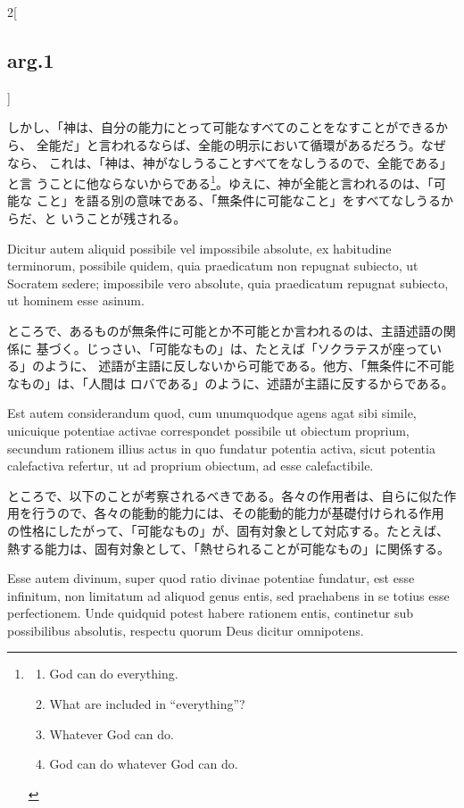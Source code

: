 \documentclass[paper=a4paper,fontsize=10pt,jafontsize=9pt,titlepage]{jlreq}
\begin{document}
\begin{paracol}{2}[\subsection{arg.1}]
\switchcolumn

しかし、「神は、自分の能力にとって可能なすべてのことをなすことができるから、
 全能だ」と言われるならば、全能の明示において循環があるだろう。なぜなら、
 これは、「神は、神がなしうることすべてをなしうるので、全能である」と言
 うことに他ならないからである\footnote
{\begin{enumerate}
  \item God can do everything.
  \item What are included in ``everything''?
  \item Whatever God can do.
  \item God can do whatever God can do.
 \end{enumerate}
}。ゆえに、神が全能と言われるのは、「可能な
 こと」を語る別の意味である、「無条件に可能なこと」をすべてなしうるからだ、と
 いうことが残される。

\switchcolumn*

Dicitur autem aliquid possibile
vel impossibile absolute, ex habitudine terminorum, possibile quidem,
quia praedicatum non repugnat subiecto, ut Socratem sedere; impossibile
vero absolute, quia praedicatum repugnat subiecto, ut hominem esse
asinum.

\switchcolumn

ところで、あるものが無条件に可能とか不可能とか言われるのは、主語述語の関係に
 基づく。じっさい、「可能なもの」は、たとえば「ソクラテスが座っている」のように、
 述語が主語に反しないから可能である。他方、「無条件に不可能なもの」は、「人間は
 ロバである」のように、述語が主語に反するからである。

\switchcolumn*

Est autem considerandum quod, cum unumquodque agens agat sibi
simile, unicuique potentiae activae correspondet possibile ut obiectum
proprium, secundum rationem illius actus in quo fundatur potentia
activa, sicut potentia calefactiva refertur, ut ad proprium obiectum, ad
esse calefactibile.

\switchcolumn

ところで、以下のことが考察されるべきである。各々の作用者は、自らに似た作
 用を行うので、各々の能動的能力には、その能動的能力が基礎付けられる作用
 の性格にしたがって、「可能なもの」が、固有対象として対応する。たとえば、
 熱する能力は、固有対象として、「熱せられることが可能なもの」に関係する。

\switchcolumn*

Esse autem divinum, super quod ratio divinae
potentiae fundatur, est esse infinitum, non limitatum ad aliquod genus
entis, sed praehabens in se totius esse perfectionem. Unde quidquid
potest habere rationem entis, continetur sub possibilibus absolutis,
respectu quorum Deus dicitur omnipotens.


\end{paracol}
\end{document}
